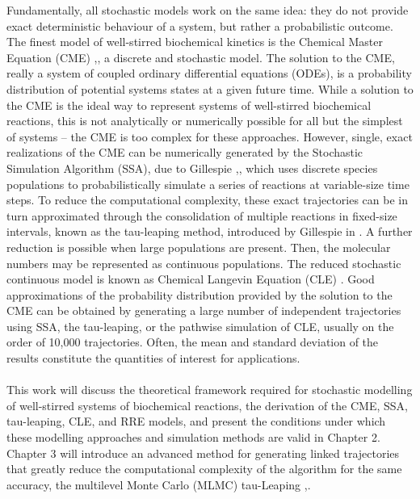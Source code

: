 \documentclass[ugrad,lot,lof,openright,11pt,oneside,onehalfspace]{RUthesis}
\begin{document}
	Fundamentally, all stochastic models work on the same idea: they do not provide exact deterministic behaviour of a system, but rather a probabilistic outcome. The finest model of well-stirred biochemical kinetics is the Chemical Master Equation (CME) \cite{cme_intro},\cite{gillespie_review}, a discrete and stochastic model. The solution to the CME, really a system of coupled ordinary differential equations (ODEs), is a probability distribution of potential systems states at a given future time. While a solution to the CME is the ideal way to represent systems of well-stirred biochemical reactions, this is not analytically or numerically possible for all but the simplest of systems -- the CME is too complex for these approaches. However, single, exact realizations of the CME can be numerically generated by the Stochastic Simulation Algorithm (SSA), due to Gillespie \cite{ssa_intro},\cite{gillespie_review}, which uses discrete species populations to probabilistically simulate a series of reactions at variable-size time steps. To reduce the computational complexity, these exact trajectories can be in turn approximated through the consolidation of multiple reactions in fixed-size intervals, known as the tau-leaping method, introduced by Gillespie in \cite{sim_chem_reactions}. A further reduction is possible when large populations are present. Then, the molecular numbers may be represented as continuous populations. The reduced stochastic continuous model is known as Chemical Langevin Equation (CLE) \cite{sim_chem_reactions}. Good approximations of the probability distribution provided by the solution to the CME can be obtained by generating a large number of independent trajectories using SSA, the tau-leaping, or the pathwise simulation of CLE, usually on the order of 10,000 trajectories. Often, the mean and standard deviation of the results constitute the quantities of interest for applications.\\
	\\
	This work will discuss the theoretical framework required for stochastic modelling of well-stirred systems of biochemical reactions, the derivation of the CME, SSA, tau-leaping, CLE, and RRE models, and present the conditions under which these modelling approaches and simulation methods are valid in Chapter 2. Chapter 3 will introduce an advanced method for generating linked trajectories that greatly reduce the computational complexity of the algorithm for the same accuracy, the multilevel Monte Carlo (MLMC) tau-Leaping \cite{mlmc_applications},\cite{mlmc_complexity}.\\
\end{document}
